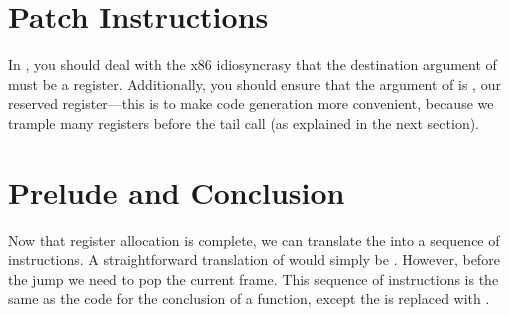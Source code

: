 \documentclass[7x10]{TimesAPriori_MIT}%
\begin{document}
\section{Patch Instructions}

In , you should deal with the x86
idiosyncrasy that the destination argument of  must be a
register. Additionally, you should ensure that the argument of
 is , our reserved register---this is to make
code generation more convenient, because we trample many registers
before the tail call (as explained in the next section).

\section{Prelude and Conclusion}


Now that register allocation is complete, we can translate the
 into a sequence of instructions. A straightforward
translation of  would simply be .
However, before the jump we need to pop the current frame. This
sequence of instructions is the same as the code for the conclusion of
a function, except the  is replaced with .
\end{document}
